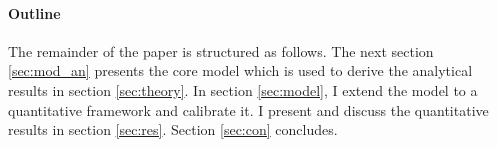 







\paragraph{Outline}
The remainder of the paper is structured as follows. The next section \ref{sec:mod_an} presents the core model which is used to derive the analytical results in section \ref{sec:theory}. In section \ref{sec:model}, I extend the model to a quantitative framework and calibrate it. I present and discuss the quantitative results in section \ref{sec:res}. Section \ref{sec:con} concludes.